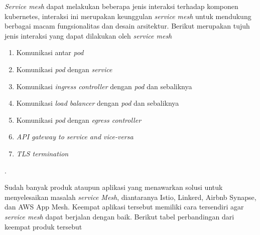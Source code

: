 \textit{Service mesh} dapat melakukan beberapa jenis interaksi terhadap komponen kubernetes, interaksi ini merupakan keunggulan \textit{service mesh} untuk mendukung berbagai macam fungsionalitas dan desain arsitektur. Berikut merupakan tujuh jenis interaksi yang dapat dilakukan oleh \textit{service mesh} \parencite{ganguli2021}

\begin{enumerate}
  \item Komunikasi antar \textit{pod}
  \item Komunikasi \textit{pod} dengan \textit{service}
  \item Komunikasi \textit{ingress controller} dengan \textit{pod} dan sebaliknya
  \item Komunikasi \textit{load balancer} dengan \textit{pod} dan sebaliknya
  \item Komunikasi \textit{pod} dengan \textit{egress controller}
  \item \textit{API gateway to service and vice-versa}
  \item \textit{TLS termination}
\end{enumerate}.

Sudah banyak produk ataupun aplikasi yang menawarkan solusi untuk menyelesaikan masalah \textit{\textit{service} Mesh}, diantaranya Istio, Linkerd, Airbnb Synapse, dan AWS App Mesh. Keempat aplikasi tersebut memiliki cara tersendiri agar \textit{\textit{service} mesh} dapat berjalan dengan baik. Berikut tabel perbandingan dari keempat produk tersebut


